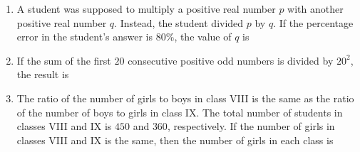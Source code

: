 \documentclass[journal,12pt,onecolumn]{article}
\theoremstyle{remark}
\begin{document}
\begin{enumerate}
    \item A student was supposed to multiply a positive real number $p$ with another positive
    real number $q$. Instead, the student divided $p$ by $q$. If the percentage error in the
    student's answer is $80\%$, the value of $q$ is

    \hfill{}
    \begin{enumerate}
    \end{enumerate}

    \item If the sum of the first $20$ consecutive positive odd numbers is divided by $20^2$, the
    result is

    \hfill{}
    \begin{enumerate}
    \end{enumerate}

    \item The ratio of the number of girls to boys in class VIII is the same as the ratio of the
    number of boys to girls in class IX. The total number of students  in
    classes VIII and IX is $450$ and $360$, respectively. If the number of girls in classes
    VIII and IX is the same, then the number of girls in each class is

    \hfill{}
    \begin{enumerate}
    \end{enumerate}


\end{enumerate}
\end{document}
